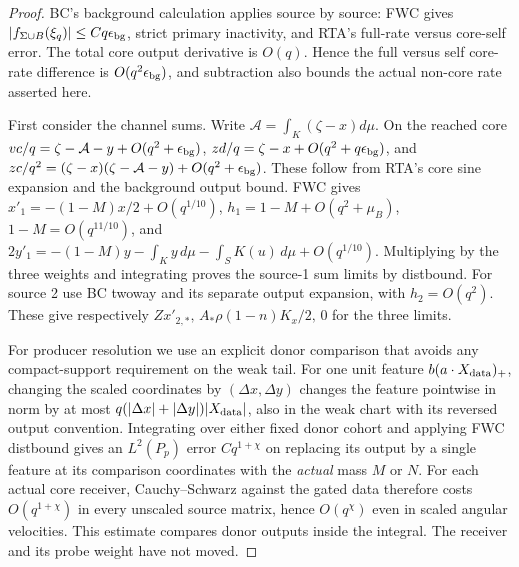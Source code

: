 \documentclass[11pt]{article}
\begin{document}
\begin{proof}
BC's background calculation applies source by source: FWC gives
\(|f_{\Sigma\cup B}(\xi_q)|\le Cq\epsilon_{\rm bg}\), strict primary
inactivity, and RTA's full-rate versus core-self error.
The total core output derivative is \(O(q)\). Hence the full versus
self core-rate difference is \(O(q^2\epsilon_{\rm bg})\), and subtraction
also bounds the actual non-core rate asserted here.

First consider the channel sums. Write \(\mathcal A=\int_K(\zeta-x)d\mu\).
On the reached core \(vc/q=\zeta-\mathcal A-y+O(q^2+\epsilon_{\rm bg})\),
\(zd/q=\zeta-x+O(q^2+q\epsilon_{\rm bg})\), and
\(zc/q^2=(\zeta-x)(\zeta-\mathcal A-y)+O(q^2+\epsilon_{\rm bg})\).
These follow from RTA's core sine expansion and the background output bound.
FWC gives \(x'_1=-(1-M)x/2+O(q^{1/10})\),
\(h_1=1-M+O(q^2+\mu_B)\), \(1-M=O(q^{11/10})\), and
\(2y'_1=-(1-M)y-\int_Ky\,d\mu-\int_SK(u)\,d\mu+O(q^{1/10})\).
Multiplying by the three weights and integrating proves the source-1 sum
limits by distbound. For source 2 use BC twoway and its separate output
expansion, with \(h_2=O(q^2)\). These give respectively
\(Zx'_{2,*},\,A_*\rho(1-n)K_x/2,\,0\) for the three limits.

For producer resolution we use an explicit donor comparison that avoids
any compact-support requirement on the weak tail. For one unit feature
\(b(a\cdot X_{\rm data})_+\), changing the scaled coordinates by
\((\Delta x,\Delta y)\) changes the feature pointwise in norm by at most
\(q(|\Delta x|+|\Delta y|)|X_{\rm data}|\), also in the weak chart with
its reversed output convention. Integrating over either fixed donor
cohort and applying FWC distbound gives an \(L^2(P_p)\) error
\(Cq^{1+\chi}\) on replacing its output by a single feature at its
comparison coordinates with the \emph{actual} mass \(M\) or \(N\).
For each actual core receiver, Cauchy--Schwarz against the gated data
therefore costs \(O(q^{1+\chi})\) in every unscaled source matrix,
hence \(O(q^\chi)\) even in scaled angular velocities. This estimate
compares donor outputs inside the integral. The receiver and its
probe weight have not moved.


\end{proof}
\end{document}
